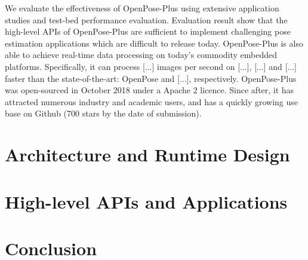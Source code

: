 \documentclass[twoside,11pt]{article}
\begin{document}
We evaluate the effectiveness of OpenPose-Plus 
using extensive application studies and
test-bed performance evaluation. 
Evaluation result show that the high-level APIs of OpenPose-Plus
are sufficient to implement challenging pose estimation
applications which are difficult to release today.
OpenPose-Plus is also able to achieve real-time data processing
on today's commodity embedded platforms. Specifically, it can
process [...] images per second on [...], [...] and [...] faster
than the state-of-the-art: OpenPose and [...], respectively. 
OpenPose-Plus was open-sourced in October 2018 under a 
Apache 2 licence. Since after, it has attracted numerous 
industry and academic users, and has a quickly growing use base on Github (700 stars by the date of submission). 

\section{Architecture and Runtime Design}

\section{High-level APIs and Applications}

\section{Conclusion}




\end{document}
